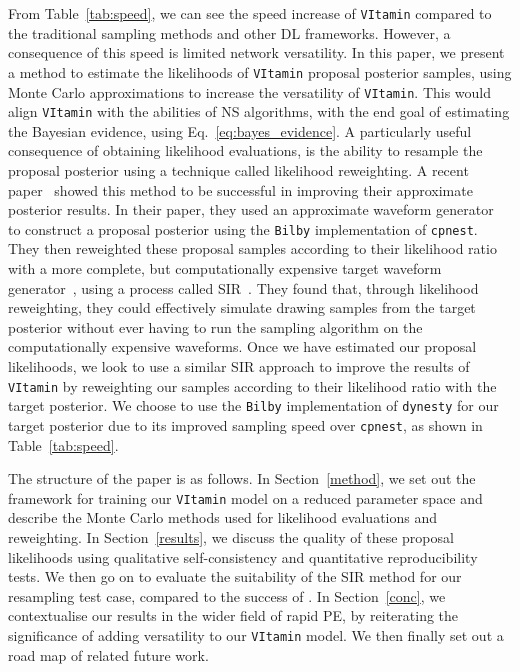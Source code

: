 \documentclass[a4paper]{jpconf}
\begin{document}
From Table~\ref{tab:speed}, we can see the speed increase of \texttt{VItamin} compared to the traditional sampling methods and other DL frameworks. However, a consequence of this speed is limited network versatility. In this paper, we present a method to estimate the likelihoods of \texttt{VItamin} proposal posterior samples, using Monte Carlo approximations to increase the versatility of \texttt{VItamin}. This would align \texttt{VItamin} with the abilities of NS algorithms, with the end goal of estimating the Bayesian evidence, using Eq.~\ref{eq:bayes_evidence}. A particularly useful consequence of obtaining likelihood evaluations, is the ability to resample the proposal posterior using a technique called likelihood reweighting. A recent paper~\cite{resample_aus} showed this method to be successful in improving their approximate posterior results. In their paper, they used an approximate waveform generator~\cite{IMRPhenomD} to construct a proposal posterior using the \texttt{Bilby} implementation of \texttt{cpnest}. They then reweighted these proposal samples according to their likelihood ratio with a more complete, but computationally expensive target waveform generator~\cite{NRHybSur3dq8}, using a process called \ac{SIR}~\cite{brian2006resampling}. They found that, through likelihood reweighting, they could effectively simulate drawing samples from the target posterior without ever having to run the sampling algorithm on the computationally expensive waveforms. Once we have estimated our proposal likelihoods, we look to use a similar \ac{SIR} approach to improve the results of \texttt{VItamin} by reweighting our samples according to their likelihood ratio with the target posterior. We choose to use the \texttt{Bilby} implementation of \texttt{dynesty} for our target posterior due to its improved sampling speed over \texttt{cpnest}, as shown in Table~\ref{tab:speed}.

The structure of the paper is as follows. In Section~\ref{method}, we set out the framework for training our \texttt{VItamin} model on a reduced parameter space and describe the Monte Carlo methods used for likelihood evaluations and reweighting. In Section~\ref{results}, we discuss the quality of these proposal likelihoods using qualitative self-consistency and quantitative reproducibility tests. We then go on to evaluate the suitability of the \ac{SIR} method for our resampling test case, compared to the success of \cite{resample_aus}. In Section~\ref{conc}, we contextualise our results in the wider field of rapid PE, by reiterating the significance of adding versatility to our \texttt{VItamin} model. We then finally set out a road map of related future work.
\end{document}
